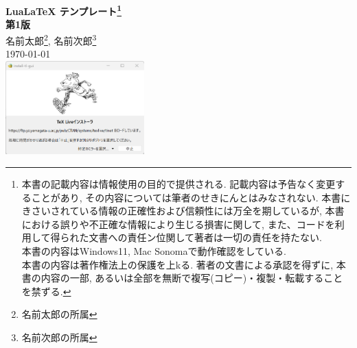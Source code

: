 \documentclass[11pt,a4paper, titlepage]{ltjsarticle}
\newcommand{\記}{\begin{center} 記 \end{center}}
\newcommand{\挨拶}{\noindent 拝啓 \ifcase\month\or 厳寒\or 春寒\or 早春
    \or 陽寒\or 新緑\or 向暑\or 猛暑\or 残暑\or 初秋\or 仲秋\or 晩秋\or 初冬
    \fi の候, ますますご清栄のこととお喜び申し上げます.}
\begin{document}
\begin{titlepage}
    \centering
    \vspace*{\fill}
    \Huge{\textbf{{Lua\LaTeX{} テンプレート\footnote{本書の記載内容は情報使用の目的で提供される. 記載内容は予告なく変更することがあり, その内容については筆者のせきにんとはみなされない. 本書にきさいされている情報の正確性および信頼性には万全を期しているが, 本書における誤りや不正確な情報により生じる損害に関して, また、コードを利用して得られた文書への責任ン位関して著者は一切の責任を持たない. \\本書の内容はWindows11, Mac Sonomaで動作確認をしている. \\本書の内容は著作権法上の保護を上kる. 著者の文書による承認を得ずに, 本書の内容の一部, あるいは全部を無断で複写(コピー)・複製・転載することを禁ずる.} \\第1版}}} \\
    \large{名前太郎\footnote{名前太郎の所属}, 名前次郎\footnote{名前次郎の所属}} \\
    \large{\today} \\
    \vspace*{\fill}
    \includegraphics[width=0.4\textwidth]{img/template.png}
\end{titlepage}
\end{document}

